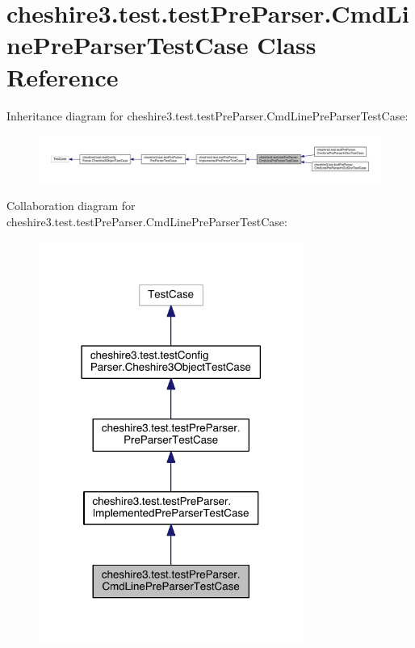 \hypertarget{classcheshire3_1_1test_1_1test_pre_parser_1_1_cmd_line_pre_parser_test_case}{\section{cheshire3.\-test.\-test\-Pre\-Parser.\-Cmd\-Line\-Pre\-Parser\-Test\-Case Class Reference}
\label{classcheshire3_1_1test_1_1test_pre_parser_1_1_cmd_line_pre_parser_test_case}
}


Inheritance diagram for cheshire3.\-test.\-test\-Pre\-Parser.\-Cmd\-Line\-Pre\-Parser\-Test\-Case\-:
\nopagebreak
\begin{figure}[H]
\begin{center}
\leavevmode
\includegraphics[width=350pt]{classcheshire3_1_1test_1_1test_pre_parser_1_1_cmd_line_pre_parser_test_case__inherit__graph}
\end{center}
\end{figure}


Collaboration diagram for cheshire3.\-test.\-test\-Pre\-Parser.\-Cmd\-Line\-Pre\-Parser\-Test\-Case\-:
\nopagebreak
\begin{figure}[H]
\begin{center}
\leavevmode
\includegraphics[width=246pt]{classcheshire3_1_1test_1_1test_pre_parser_1_1_cmd_line_pre_parser_test_case__coll__graph}
\end{center}
\end{figure}
